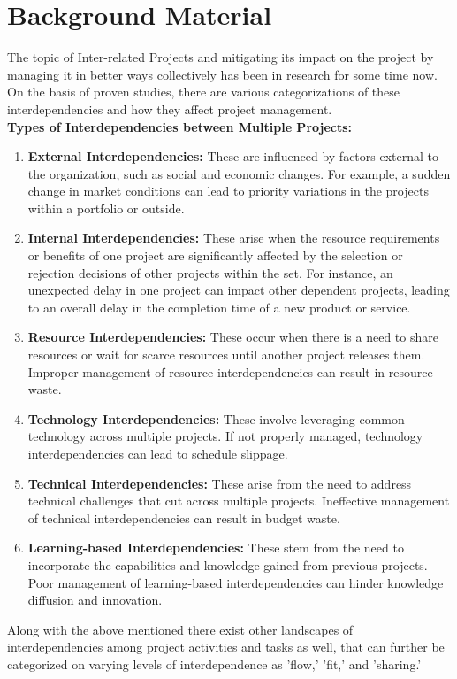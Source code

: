 \documentclass{llncs}
\begin{document}
\section{Background Material}
The topic of Inter-related Projects and mitigating its impact on the project by managing it in better ways collectively has been in research for some time now. On the basis of proven studies, there are various categorizations of these interdependencies and how they affect project management. \\
\textbf{Types of Interdependencies between Multiple Projects:}
\begin{enumerate}
\item \textbf{External Interdependencies:} These are influenced by factors external to the organization, such as social and economic changes. For example, a sudden change in market conditions can lead to priority variations in the projects within a portfolio or outside.~\cite{refpaper2}
\item \textbf{Internal Interdependencies:} These arise when the resource requirements or benefits of one project are significantly affected by the selection or rejection decisions of other projects within the set. For instance, an unexpected delay in one project can impact other dependent projects, leading to an overall delay in the completion time of a new product or service.~\cite{refpaper2}
\item \textbf{Resource Interdependencies:} These occur when there is a need to share resources or wait for scarce resources until another project releases them. Improper management of resource interdependencies can result in resource waste.~\cite{refpaper2}
\item\textbf{Technology Interdependencies:} These involve leveraging common technology across multiple projects. If not properly managed, technology interdependencies can lead to schedule slippage.~\cite{refpaper2}
\item \textbf{Technical Interdependencies:} These arise from the need to address technical challenges that cut across multiple projects. Ineffective management of technical interdependencies can result in budget waste. \item\textbf{Learning-based Interdependencies:} These stem from the need to incorporate the capabilities and knowledge gained from previous projects. Poor management of learning-based interdependencies can hinder knowledge diffusion and innovation.~\cite{refpaper2}
\end{enumerate}
Along with the above mentioned there exist other landscapes of interdependencies among project activities and tasks as well, that can further be categorized on varying levels of interdependence as  'flow,' 'fit,' and 'sharing.'~\cite{refpaper5} \\
\end{document}

